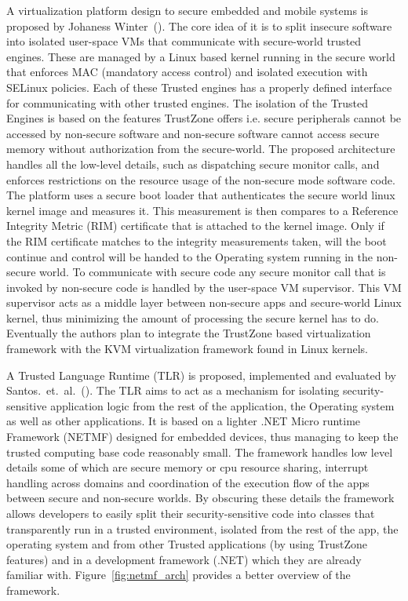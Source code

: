 \documentclass[cameraready]{cseminar}
\begin{document}
A virtualization platform design to secure embedded and mobile systems is proposed by Johaness Winter~(\cite{trusted}). The core idea of it is to split insecure software into isolated user-space VMs that communicate with secure-world trusted engines. These are managed by a Linux based kernel running in the secure world that enforces MAC (mandatory access control) and isolated execution with SELinux policies. Each of these Trusted engines has a properly defined interface for communicating with other trusted engines. The isolation of the Trusted Engines is based on the features TrustZone offers i.e. secure peripherals cannot be accessed by non-secure software and non-secure software cannot access secure memory without authorization from the secure-world. The proposed architecture handles all the low-level details, such as dispatching secure monitor calls, and enforces restrictions on the resource usage of the non-secure mode software code. 
The platform uses a secure boot loader that authenticates the secure world linux kernel image and measures it. This measurement is then compares to a Reference Integrity Metric (RIM) certificate that is attached to the kernel image. Only if the RIM certificate matches to the integrity measurements taken, will the boot continue and control will be handed to the Operating system running in the non-secure world. 
To communicate with secure code any secure monitor call that is invoked by non-secure code is handled by the user-space VM supervisor. This VM supervisor acts as a middle layer between non-secure apps and secure-world Linux kernel, thus minimizing the amount of processing the secure kernel has to do. Eventually the authors plan to integrate the TrustZone based virtualization framework with the KVM virtualization framework found in Linux kernels.

A Trusted Language Runtime (TLR) is proposed, implemented and evaluated by Santos.~et.~al.~(\cite{tlrms}). The TLR aims to act as a mechanism for isolating security-sensitive  application logic from the rest of the application, the Operating system as well as other applications. It is based on a lighter .NET Micro runtime Framework (NETMF) designed for embedded devices, thus managing to keep the trusted computing base code reasonably small. 
The framework handles low level details some of which are secure memory or cpu resource sharing, interrupt handling across domains and coordination of the execution flow of the apps between secure and non-secure worlds. By obscuring these details the framework allows developers to easily split their security-sensitive code into classes that transparently run in a trusted environment, isolated from the rest of the app, the operating system and from other Trusted applications (by using TrustZone features) and in a development framework (.NET) which they are already familiar with. Figure~\ref{fig:netmf_arch} provides a better overview of the framework.
\end{document}
